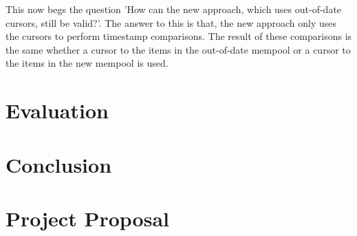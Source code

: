 \documentclass[12pt,a4paper,twoside,openright]{report}
\begin{document}
		This now begs the question 'How can the new approach, which uses out-of-date cursors, still be valid?'.
		The answer to this is that, the new approach only uses the cursors to perform timestamp comparisons.
		The result of these comparisons is the same whether a cursor to the items in the out-of-date mempool or a cursor to the items in the new mempool is used.

	\chapter{Evaluation}
	
	\chapter{Conclusion}
	
	
	
	
	
	\appendix

	\chapter{Project Proposal}
	
	
	
	
\end{document}
